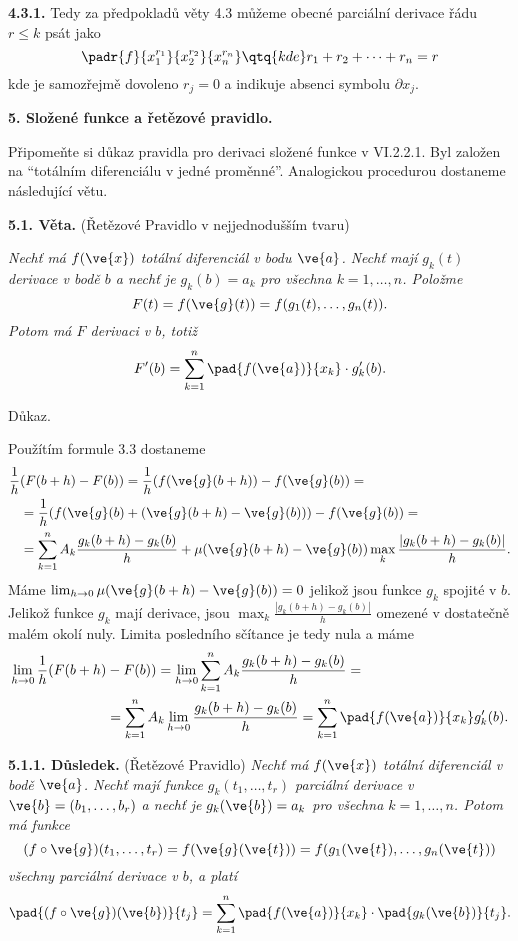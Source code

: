 \documentclass[12pt]{article}
\begin{document}
{{\bf 4.3.1.} Tedy za předpokladů věty 4.3 můžeme obecné parciální derivace
řádu $r\leq k$ psát jako
$$
\padr{f}{x_1^{r_1}}{x_2^{r_2}}{x_n^{r_n}}\qtq{kde} r_1+r_2+\cdots+r_n=r
$$
kde je samozřejmě dovoleno $r_j=0$ a indikuje absenci symbolu $\partial x_j$.



\vskip10mm
 
  
 {\large\bf 5. Složené funkce a řetězové pravidlo.}
 
 \bigskip
 
Připomeňte si důkaz pravidla pro derivaci složené funkce v VI.2.2.1.
Byl založen na ``totálním diferenciálu v jedné proměnné''. Analogickou procedurou dostaneme následující větu.

\medskip


{\bf 5.1. Věta.} (Řetězové Pravidlo v nejjednodušším tvaru) {\em Nechť má $f(\ve{x})$ totální diferenciál v bodu $\ve{a}$. 
Nechť mají $g_k(t)$ derivace v bodě $b$ 
a nechť je $g_k(b)=a_k$ pro všechna $k=1,\dots,n$. Položme
$$
F(t)=f(\ve{g}(t))=f(g_1(t),\dots,g_n(t)).
$$
Potom má $F$ derivaci v  $b$, totiž
$$
F'(b)=\sum_{k=1}^n\pad{f(\ve{a})}{x_k}\cdot g'_k(b).
$$

Důkaz.} Použítím formule  3.3 
dostaneme
$$ \begin{aligned}
\frac1h&(F(b+h)-F(b))=\frac1h(f(\ve{g}(b+h))-f(\ve{g}(b))=\\
&=\frac1h(f(\ve{g}(b)+(\ve{g}(b+h)-\ve{g}(b)))-f(\ve{g}(b))=\\
&=\sum_{k=1}^nA_k\frac{g_k(b+h)-g_k(b)}{h}+ \mu(\ve{g}(b+h)-\ve{g}(b))\max_k\frac{|g_k(b+h)-g_k(b)|}{h}.
\end{aligned}
$$
Máme $\lim_{h\to 0}\mu(\ve{g}(b+h)-\ve{g}(b))=0$ jelikož jsou funkce $g_k$ spojité v $b$. Jelikož funkce $g_k$ mají derivace, jsou
$\max_k\frac{|g_k(b+h)-g_k(b)|}{h}$  omezené v dostatečně malém okolí nuly. Limita posledního sčítance je tedy nula a máme
$$
\begin{aligned}
\lim_{h\to 0}\frac1h(F(b+h)&-F(b))
=\lim_{h\to 0}\sum_{k=1}^nA_k\frac{g_k(b+h)-g_k(b)}{h}=\\
&=\sum_{k=1}^nA_k\lim_{h\to 0}\frac{g_k(b+h)-g_k(b)}{h}=\sum_{k=1}^n \pad{f(\ve{a})}{x_k}g'_k(b).
\end{aligned}
$$
\sq

\bigskip

{\bf 5.1.1. Důsledek.} (Řetězové Pravidlo)  {\em Nechť má $f(\ve{x})$ totální diferenciál v bodě $\ve{a}$. 
Nechť mají funkce $g_k(t_1,\dots,t_r)$ parciální derivace 
v $\ve{b}=(b_1,\dots,b_r)$ a nechť je $g_k(\ve{b})=a_k$ pro všechna $k=1,\dots,n$. Potom má funkce
$$
(f\circ \ve{g})(t_1,\dots,t_r)=f(\ve{g}(\ve{t}))=f(g_1(\ve{t}),\dots,g_n(\ve{t}))
$$
všechny parciální derivace v $b$, a platí
$$
\pad{(f\circ\ve{g})(\ve{b})}{t_j}=\sum_{k=1}^n\pad{f(\ve{a})}{x_k}\cdot \pad{g_k(\ve{b})}{t_j}.
$$
}

}
\end{document}
